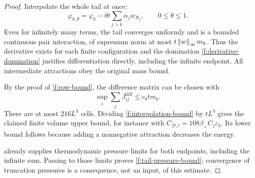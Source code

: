 \begin{proof}
Interpolate the whole tail at once:
\[
 \varphi_{k,\theta}
 =\varphi_k-\theta t\sum_{j>k}\alpha_jw_{R_j},
 \qquad 0\le\theta\le1.
\]
Even for infinitely many terms, the tail converges uniformly and is
a bounded continuous pair interaction, of supremum norm at most
$t\left\lVert w\right\rVert_\infty m_k$.  Thus the derivative exists for each finite
configuration and the domination \eqref{f:derivative-domination}
justifies differentiation directly, including the infinite endpoint.
All intermediate attractions obey the original mass bound.

By the proof of \eqref{f:row-bound}, the difference matrix can be
chosen with
\[
 \sup_i\sum_jJ^{\mathrm{diff}}_{ij}\le c_btm_k.
\]
There are at most $216L^3$ cells.  Dividing
\eqref{f:interpolation-bound} by $tL^3$ gives the claimed finite
volume upper bound, for instance with
$C_{\mathcal D,t}=108\beta_+C_1c_b$.  Its lower bound follows because
adding a nonnegative attraction decreases the energy.

 already supplies thermodynamic pressure
limits for both endpoints, including the infinite sum.  Passing to
those limits proves \eqref{f:tail-pressure-bound}; convergence of
truncation pressures is a consequence, not an input, of this estimate.
\end{proof}
